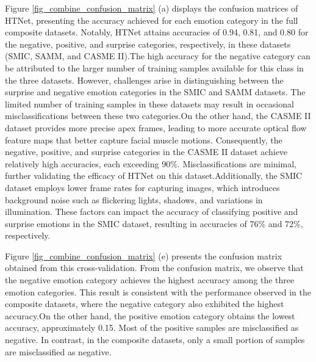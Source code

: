 \documentclass[review,12pt, 3p]{elsarticle}
\begin{document}
Figure \ref{fig_combine_confusion_matrix} (a) displays the confusion matrices of HTNet, presenting the accuracy achieved for each emotion category in the full composite datasets. Notably, HTNet attains accuracies of 0.94, 0.81, and 0.80 for the negative, positive, and surprise categories, respectively, in these datasets (SMIC, SAMM, and CASME II).The high accuracy for the negative category can be attributed to the larger number of training samples available for this class in the three datasets. However, challenges arise in distinguishing between the surprise and negative emotion categories in the SMIC and SAMM datasets. The limited number of training samples in these datasets may result in occasional misclassifications between these two categories.On the other hand, the CASME II dataset provides more precise apex frames, leading to more accurate optical flow feature maps that better capture facial muscle motions. Consequently, the negative, positive, and surprise categories in the CASME II dataset achieve relatively high accuracies, each exceeding 90\%. Misclassifications are minimal, further validating the efficacy of HTNet on this dataset.Additionally, the SMIC dataset employs lower frame rates for capturing images, which introduces background noise such as flickering lights, shadows, and variations in illumination. These factors can impact the accuracy of classifying positive and surprise emotions in the SMIC dataset, resulting in accuracies of 76\% and 72\%, respectively.

Figure \ref{fig_combine_confusion_matrix} (e) presents the confusion matrix obtained from this cross-validation. From the confusion matrix, we observe that the negative emotion category achieves the highest accuracy among the three emotion categories. This result is consistent with the performance observed in the composite datasets, where the negative category also exhibited the highest accuracy.On the other hand, the positive emotion category obtains the lowest accuracy, approximately 0.15. Most of the positive samples are misclassified as negative. In contrast, in the composite datasets, only a small portion of samples are misclassified as negative.
\end{document}
